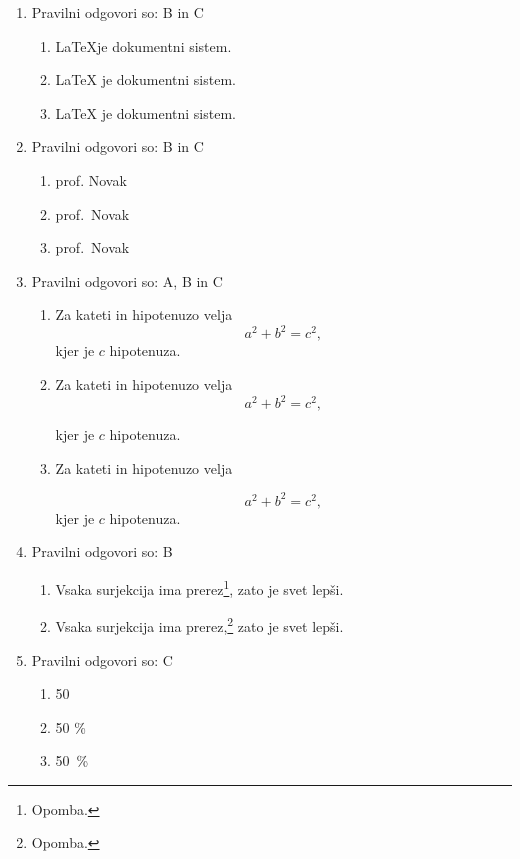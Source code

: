 \documentclass[11pt]{article}
\begin{document}
\begin{enumerate}
    \item Pravilni odgovori so: B in C %
    \begin{enumerate}
        \item \LaTeX je dokumentni sistem.
        \item {\LaTeX} je dokumentni sistem.
        \item \LaTeX{} je dokumentni sistem.
    \end{enumerate}

    \item Pravilni odgovori so: B in C %
    \begin{enumerate}
        \item prof. Novak
        \item prof.~Novak
        \item prof.\ Novak
    \end{enumerate}

    \item Pravilni odgovori so: A, B in C %
    \begin{enumerate}
        \item
Za kateti in hipotenuzo velja
\[
  a^2 + b^2 = c^2,
\]
kjer je \(c\) hipotenuza.
        \item
Za kateti in hipotenuzo velja
\[
  a^2 + b^2 = c^2,
\]

kjer je \(c\) hipotenuza.
        \item
Za kateti in hipotenuzo velja

\[
  a^2 + b^2 = c^2,
\]
kjer je \(c\) hipotenuza.
    \end{enumerate}

    \item Pravilni odgovori so: B %
    \begin{enumerate}
        \item Vsaka surjekcija ima prerez\footnote{Opomba.}, zato je svet lepši.
        \item Vsaka surjekcija ima prerez,\footnote{Opomba.} zato je svet lepši.
    \end{enumerate}

    \item Pravilni odgovori so: C %
    \begin{enumerate}
        \item 50 %
        \item 50 \%
        \item 50~\%
    \end{enumerate}


\end{enumerate}
\end{document}
